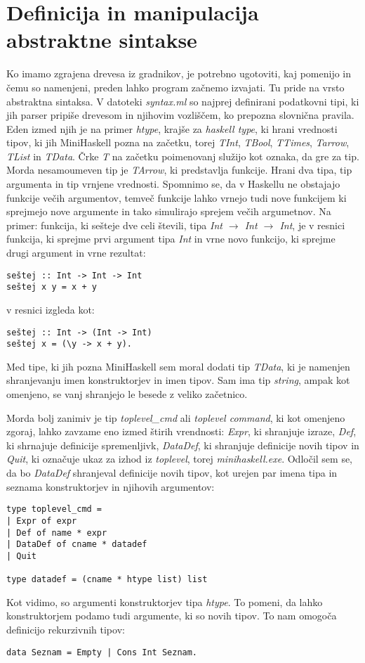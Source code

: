 \documentclass[12pt,a4paper,openany]{book}
\begin{document}
\section{Definicija in manipulacija abstraktne sintakse}
Ko imamo zgrajena drevesa iz gradnikov, je potrebno ugotoviti, kaj pomenijo in čemu so namenjeni, preden lahko program začnemo izvajati. Tu pride na vrsto abstraktna sintaksa. 
V datoteki \emph{syntax.ml} so najprej definirani podatkovni tipi, ki jih parser pripiše drevesom in njihovim vozliščem, ko prepozna slovnična pravila. Eden izmed njih je na primer 
\emph{htype}, krajše za \textit{haskell type}, ki hrani vrednosti tipov, ki jih MiniHaskell pozna na začetku, torej \emph{TInt}, \emph{TBool}, \emph{TTimes}, \emph{Tarrow}, \emph{TList} in 
\emph{TData}. Črke \emph{T} na začetku poimenovanj služijo kot oznaka, da gre za tip. Morda nesamoumeven tip je \emph{TArrow}, ki predstavlja funkcije. Hrani dva tipa, tip argumenta
in tip vrnjene vrednosti. Spomnimo se, da v Haskellu ne obstajajo funkcije večih argumentov, temveč funkcije lahko vrnejo tudi nove funkcijem ki sprejmejo nove argumente in tako 
simulirajo sprejem večih argumetnov. Na primer: funkcija, ki sešteje dve celi števili, tipa \emph{Int $\rightarrow$ Int $\rightarrow$ Int}, je v resnici funkcija, ki sprejme prvi argument tipa \emph{Int}
in vrne novo funkcijo, ki sprejme drugi argument in vrne rezultat:
\begin{lstlisting}
seštej :: Int -> Int -> Int
seštej x y = x + y
\end{lstlisting}
v resnici izgleda kot:
\begin{lstlisting}
seštej :: Int -> (Int -> Int)
seštej x = (\y -> x + y).
\end{lstlisting}
Med tipe, ki jih pozna MiniHaskell sem moral dodati tip \emph{TData}, ki je namenjen shranjevanju imen konstruktorjev in imen tipov. Sam ima tip \emph{string}, ampak kot omenjeno, 
se vanj shranjejo le besede z veliko začetnico. 

Morda bolj zanimiv je tip \emph{toplevel\_cmd} ali \textit{toplevel command}, ki kot omenjeno zgoraj, lahko zavzame eno izmed štirih vrendnosti: \emph{Expr}, ki shranjuje izraze, 
\emph{Def}, ki shrnajuje definicije spremenljivk, \emph{DataDef}, ki shranjuje definicije novih tipov in \emph{Quit}, ki označuje ukaz za izhod iz \emph{toplevel}, torej 
\emph{minihaskell.exe}. Odločil sem se, da bo \emph{DataDef} shranjeval definicije novih tipov, kot urejen par imena tipa in seznama konstruktorjev in njihovih argumentov:
\begin{lstlisting}
type toplevel_cmd =
| Expr of expr
| Def of name * expr
| DataDef of cname * datadef
| Quit

type datadef = (cname * htype list) list
\end{lstlisting}
Kot vidimo, so argumenti konstruktorjev tipa \emph{htype}. To pomeni, da lahko konstruktorjem podamo tudi argumente, ki so novih tipov. To nam omogoča definicijo rekurzivnih tipov:
\begin{lstlisting}
data Seznam = Empty | Cons Int Seznam.
\end{lstlisting}
\end{document}
